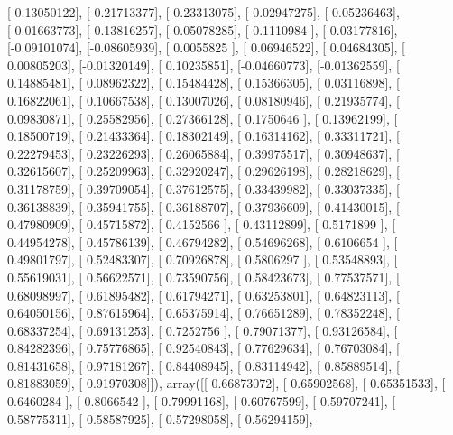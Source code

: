 \documentclass{article}
\begin{document}
       [-0.13050122],
       [-0.21713377],
       [-0.23313075],
       [-0.02947275],
       [-0.05236463],
       [-0.01663773],
       [-0.13816257],
       [-0.05078285],
       [-0.1110984 ],
       [-0.03177816],
       [-0.09101074],
       [-0.08605939],
       [ 0.0055825 ],
       [ 0.06946522],
       [ 0.04684305],
       [ 0.00805203],
       [-0.01320149],
       [ 0.10235851],
       [-0.04660773],
       [-0.01362559],
       [ 0.14885481],
       [ 0.08962322],
       [ 0.15484428],
       [ 0.15366305],
       [ 0.03116898],
       [ 0.16822061],
       [ 0.10667538],
       [ 0.13007026],
       [ 0.08180946],
       [ 0.21935774],
       [ 0.09830871],
       [ 0.25582956],
       [ 0.27366128],
       [ 0.1750646 ],
       [ 0.13962199],
       [ 0.18500719],
       [ 0.21433364],
       [ 0.18302149],
       [ 0.16314162],
       [ 0.33311721],
       [ 0.22279453],
       [ 0.23226293],
       [ 0.26065884],
       [ 0.39975517],
       [ 0.30948637],
       [ 0.32615607],
       [ 0.25209963],
       [ 0.32920247],
       [ 0.29626198],
       [ 0.28218629],
       [ 0.31178759],
       [ 0.39709054],
       [ 0.37612575],
       [ 0.33439982],
       [ 0.33037335],
       [ 0.36138839],
       [ 0.35941755],
       [ 0.36188707],
       [ 0.37936609],
       [ 0.41430015],
       [ 0.47980909],
       [ 0.45715872],
       [ 0.4152566 ],
       [ 0.43112899],
       [ 0.5171899 ],
       [ 0.44954278],
       [ 0.45786139],
       [ 0.46794282],
       [ 0.54696268],
       [ 0.6106654 ],
       [ 0.49801797],
       [ 0.52483307],
       [ 0.70926878],
       [ 0.5806297 ],
       [ 0.53548893],
       [ 0.55619031],
       [ 0.56622571],
       [ 0.73590756],
       [ 0.58423673],
       [ 0.77537571],
       [ 0.68098997],
       [ 0.61895482],
       [ 0.61794271],
       [ 0.63253801],
       [ 0.64823113],
       [ 0.64050156],
       [ 0.87615964],
       [ 0.65375914],
       [ 0.76651289],
       [ 0.78352248],
       [ 0.68337254],
       [ 0.69131253],
       [ 0.7252756 ],
       [ 0.79071377],
       [ 0.93126584],
       [ 0.84282396],
       [ 0.75776865],
       [ 0.92540843],
       [ 0.77629634],
       [ 0.76703084],
       [ 0.81431658],
       [ 0.97181267],
       [ 0.84408945],
       [ 0.83114942],
       [ 0.85889514],
       [ 0.81883059],
       [ 0.91970308]]), array([[ 0.66873072],
       [ 0.65902568],
       [ 0.65351533],
       [ 0.6460284 ],
       [ 0.8066542 ],
       [ 0.79991168],
       [ 0.60767599],
       [ 0.59707241],
       [ 0.58775311],
       [ 0.58587925],
       [ 0.57298058],
       [ 0.56294159],
\end{document}
